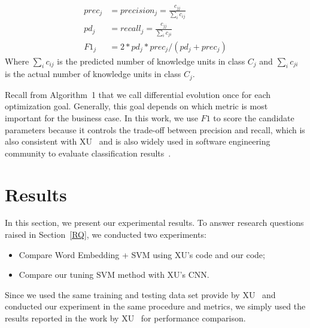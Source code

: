 \documentclass[sigconf,review, anonymous]{acmart}
\theoremstyle{break}
\newcommand{\bi}{\begin{itemize}[leftmargin=0.4cm]}
\newcommand{\ei}{\end{itemize}}
\begin{document}
{\[
\begin{array}{ll}
prec_j &= precision_j = \frac{c_{jj}}{\sum_{i}c_{ij}}\\
pd_j &= recall_j = \frac{c_{jj}}{\sum_{i}c_{ji}}\\ 
F1_{j} &= 2*pd_j*prec_j/(pd_j + prec_j)
\end{array}
\]}
Where $\sum_{i}c_{ij}$ is the predicted number of knowledge units in class $C_j$ 
and ${\sum_{i}c_{ji}}$ is the actual number of knowledge units in class $C_j$.


Recall from Algorithm~1 that we call differential evolution once for each
optimization goal. Generally, this goal depends on which metric is most important for
the business case. In this work, we use $F1$ to score the candidate parameters because it controls
the trade-off between precision and recall, which is also consistent with XU~\cite{xu2016predicting}
and is also widely used in software engineering
community to evaluate classification results~\cite{wang2016automatically,menzies2007data,fu2016tuning,kim2008classifying}.


\section{Results}\label{results}
In this section, we present our experimental results. To answer research questions raised in
Section~\ref{RQ}, we conducted two experiments:
\bi
\item
Compare   Word Embedding + SVM using XU's code and our code;
\item
Compare our tuning SVM method with XU's CNN.

\ei
Since we used the same training and testing data set provide by XU~\cite{xu2016predicting} and conducted our experiment in the same procedure and metrics, we simply used the results reported in the work by XU~\cite{xu2016predicting} for performance comparison. 
\end{document}
